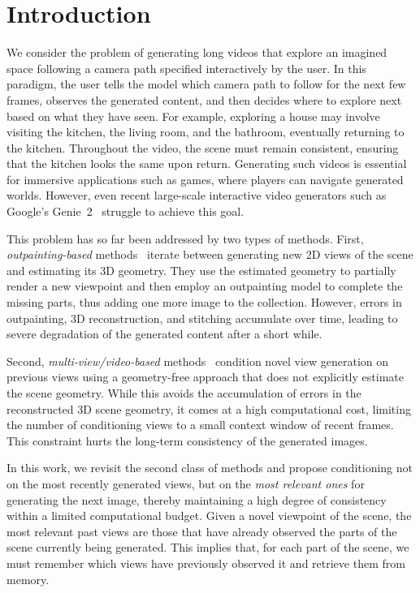 \section{Introduction}%
\label{sec:intro}

We consider the problem of generating long videos that explore an imagined space following a camera path specified interactively by the user.
In this paradigm, the user tells the model which camera path to follow for the next few frames, observes the generated content, and then decides where to explore next based on what they have seen.
For example, exploring a house may involve visiting the kitchen, the living room, and the bathroom, eventually returning to the kitchen.
Throughout the video, the scene must remain consistent, ensuring that the kitchen looks the same upon return.
Generating such videos is essential for immersive applications such as games, where players can navigate generated worlds.
However, even recent large-scale interactive video generators such as Google's Genie~2~\cite{parker-holder24genie} struggle to achieve this goal.

This problem has so far been addressed by two types of methods.
First, \emph{outpainting-based} methods~\cite{wiles2020synsin, SceneScape, hoellein2023text2room, muller2024multidiff, popov24camctrl3d, yu2024viewcrafter, seo2024genwarp, koh2023simple, liu2021infinite, rockwell2021pixelsynth} iterate between generating new 2D views of the scene and estimating its 3D geometry.
They use the estimated geometry to partially render a new viewpoint and then employ an outpainting model to complete the missing parts, thus adding one more image to the collection.
However, errors in outpainting, 3D reconstruction, and stitching accumulate over time, leading to severe degradation of the generated content after a short while.

Second, \emph{multi-view/video-based} methods~\cite{geogpt, photometricnvs, ren2022look, wang2024motionctrl, parker-holder24genie} condition novel view generation on previous views using a geometry-free approach that does not explicitly estimate the scene geometry.
While this avoids the accumulation of errors in the reconstructed 3D scene geometry, it comes at a high computational cost, limiting the number of conditioning views to a small context window of recent frames.
This constraint hurts the long-term consistency of the generated images.



In this work, we revisit the second class of methods and propose conditioning not on the most recently generated views, but on the \emph{most relevant ones} for generating the next image, thereby maintaining a high degree of consistency within a limited computational budget.
Given a novel viewpoint of the scene, the most relevant past views are those that have already observed the parts of the scene currently being generated.
This implies that, for each part of the scene, we must remember which views have previously observed it and retrieve them from memory.

